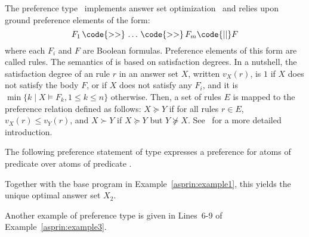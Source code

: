 The preference type~ implements answer set optimization~\cite{brnitr03a} and relies upon
ground preference elements of the form:
\[ F_1 \, \code{>>} \, \dots \, \code{>>} \, F_m \code{ || }F\]
where each $F_i$ and $F$ are Boolean formulas.
Preference elements of this form are called  rules.  
The semantics of  is based on satisfaction degrees.
In a nutshell,
the satisfaction degree of an  rule $r$ in an answer set $X$, 
written $v_X(r)$, is 
$1$ if $X$ does not satisfy the body $F$, %
or  if $X$ does not satisfy any $F_i$, 
and it is $\min\{k \mid X \models F_k, 1\leq k\leq n\}$ otherwise.
Then, a set of  rules $E$ is mapped to the preference relation defined as follows:
$X \succeq Y$ if for all rules $r \in E$, $v_X(r) \leq v_Y(r)$, 
and $X \succ Y$ if $X \succeq Y$ but $Y \not\succeq X$. 
See~\cite{brnitr03a} for a more detailed introduction.

%
\begin{example}\label{asprin:asoexample}
%
%
The following preference statement of type  expresses a preference 
for atoms of predicate \code{a/1} over atoms of predicate \code{b/1}.
%

%
Together with the base program in Example~\ref{asprin:example1}, this yields the unique optimal answer set $X_2$.  
\end{example} %
Another example of preference type  is given in Lines~6-9 of Example~\ref{asprin:example3}.

